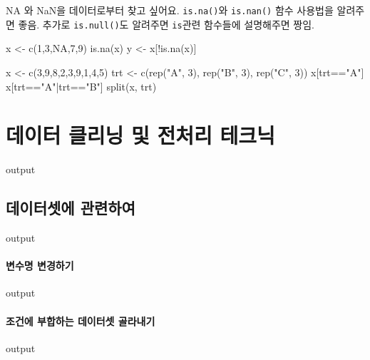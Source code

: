 \documentclass{report}
\begin{document}
NA 와 NaN을 데이터로부터 찾고 싶어요. 
\texttt{is.na()}와 \texttt{is.nan()} 함수 사용법을 알려주면 좋음.  추가로 \texttt{is.null()}도 알려주면 \texttt{is}관련 함수들에 설명해주면 짱임.

\begin{Schunk}
\begin{Soutput}
x <- c(1,3,NA,7,9)
is.na(x)
y <- x[!is.na(x)]

x <- c(3,9,8,2,3,9,1,4,5)
trt <- c(rep("A", 3), rep("B", 3), rep("C", 3))
x[trt=="A"]
x[trt=="A"|trt=="B"]
split(x, trt)

\end{Soutput}
\end{Schunk}

\section{데이터 클리닝 및 전처리 테크닉}

\begin{Schunk}
\begin{Soutput}
output
\end{Soutput}
\end{Schunk}

\subsection{데이터셋에 관련하여}

\begin{Schunk}
\begin{Soutput}
output
\end{Soutput}
\end{Schunk}

\paragraph{변수명 변경하기}
\begin{Schunk}
\begin{Soutput}
output
\end{Soutput}
\end{Schunk}

\paragraph{조건에 부합하는 데이터셋 골라내기}
\begin{Schunk}
\begin{Soutput}
output
\end{Soutput}
\end{Schunk}
\end{document}

